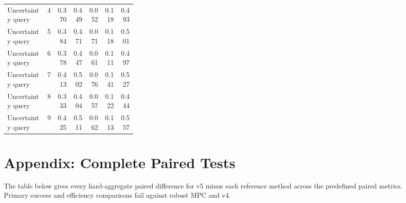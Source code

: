 \documentclass{article}
\begin{document}
\begin{center}
\begin{longtable}{p{0.31\linewidth}rrrrrr}
Uncertainty query & 4 & 0.370 & 0.449 & 0.052 & 0.118 & 0.493\\
Uncertainty query & 5 & 0.384 & 0.471 & 0.071 & 0.118 & 0.501\\
Uncertainty query & 6 & 0.378 & 0.447 & 0.061 & 0.111 & 0.497\\
Uncertainty query & 7 & 0.413 & 0.502 & 0.076 & 0.141 & 0.527\\
Uncertainty query & 8 & 0.333 & 0.404 & 0.057 & 0.122 & 0.444\\
Uncertainty query & 9 & 0.425 & 0.511 & 0.062 & 0.113 & 0.557\\
\bottomrule
\end{longtable}
\normalsize
\end{center}
\section{Appendix: Complete Paired Tests}
The table below gives every hard-aggregate paired difference for v5 minus each reference method across the predefined paired metrics. Primary success and efficiency comparisons fail against robust MPC and v4.
\end{document}
